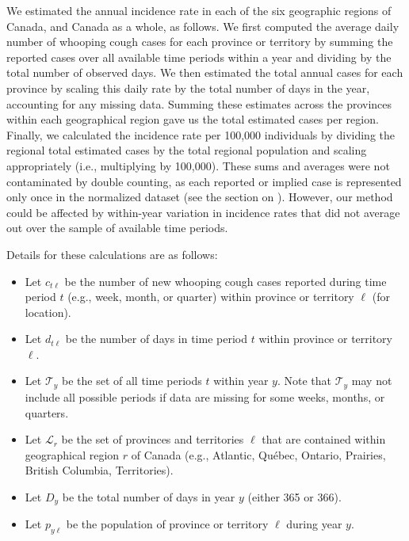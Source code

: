 \documentclass[12pt]{article}
\begin{document}
We estimated the annual incidence rate in each of the six geographic regions of Canada, and Canada as a whole, as follows. We first computed the average daily number of whooping cough cases for each province or territory by summing the reported cases over all available time periods within a year and dividing by the total number of observed days. We then estimated the total annual cases for each province by scaling this daily rate by the total number of days in the year, accounting for any missing data. Summing these estimates across the provinces within each geographical region gave us the total estimated cases per region. Finally, we calculated the incidence rate per 100,000 individuals by dividing the regional total estimated cases by the total regional population and scaling appropriately (i.e., multiplying by 100,000). These sums and averages were not contaminated by double counting, as each reported or implied case is represented only once in the normalized dataset (see the section on ). However, our method could be affected by within-year variation in incidence rates that did not average out over the sample of available time periods.

Details for these calculations are as follows:
\begin{itemize}
    \item Let \( c_{t\ell} \) be the number of new whooping cough cases reported during time period \( t \) (e.g., week, month, or quarter) within province or territory \( \ell \) (for location).
    \item Let \( d_{t\ell} \) be the number of days in time period \( t \) within province or territory \( \ell \).
    \item Let \( {\mathcal T}_y \) be the set of all time periods \( t \) within year \( y \). Note that \( {\mathcal T}_y \) may not include all possible periods if data are missing for some weeks, months, or quarters.
    \item Let \( {\mathcal L}_r \) be the set of provinces and territories \( \ell \) that are contained within geographical region \( r \) of Canada (e.g., Atlantic, Québec, Ontario, Prairies, British Columbia, Territories).
    \item Let \( D_y \) be the total number of days in year \( y \) (either 365 or 366).
    \item Let \( p_{y\ell} \) be the population of province or territory \( \ell \) during year \( y \).
\end{itemize}
\end{document}
